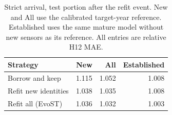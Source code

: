 \begin{table}[t]
\centering
\caption{Strict arrival, test portion after the refit event. New and All use the calibrated target-year reference. Established uses the same mature model without new sensors as its reference. All entries are relative H12 MAE.}
\label{tab:arrival}
\begin{tabular}{lrrr}
\toprule
Strategy & New & All & Established \\
\midrule
Borrow and keep & 1.115 & 1.052 & 1.008 \\
Refit new identities & 1.038 & 1.035 & 1.008 \\
Refit all (EvoST) & 1.036 & 1.032 & 1.003 \\
\bottomrule
\end{tabular}
\end{table}
